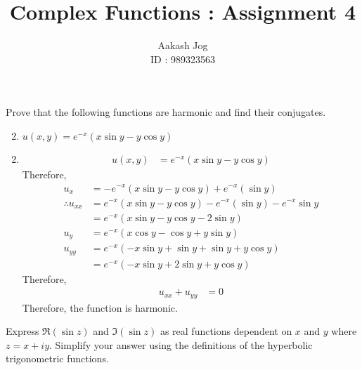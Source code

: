 \documentclass[fleqn, a4paper, 11pt, oneside]{amsart}
\title{Complex Functions : Assignment 4}
\author
{
	Aakash Jog\\
	ID : 989323563
}
\date{\formatdate{18}{11}{2015}}
\theoremstyle{definition}
\theoremstyle{theorem}
\begin{document}

\maketitle

\setcounter{question}{1}
\begin{question}
	Prove that the following functions are harmonic and find their conjugates.
	\begin{enumerate}
		\setcounter{enumi}{1}
		\item $u(x,y) = e^{-x} (x \sin y - y \cos y)$
	\end{enumerate}
\end{question}

\begin{solution}
	\begin{enumerate}
		\setcounter{enumi}{1}
		\item
			\begin{align*}
				u(x,y) & = e^{-x} (x \sin y - y \cos y)
			\end{align*}
			Therefore,
			\begin{align*}
				u_x                & = -e^{-x} (x \sin y - y \cos y) + e^{-x} (\sin y)                \\
				\therefore u_{x x} & = e^{-x} (x \sin y - y \cos y) - e^{-x} (\sin y) - e^{-x} \sin y \\
                                                   & = e^{-x} \left( x \sin y - y \cos y - 2 \sin y \right)           \\
				u_y                & = e^{-x} (x \cos y - \cos y + y \sin y)                          \\
				u_{y y}            & = e^{-x} \left( -x \sin y + \sin y + \sin y + y \cos y \right)   \\
                                                   & = e^{-x} \left( -x \sin y + 2 \sin y + y \cos y \right)
			\end{align*}
			Therefore,
			\begin{align*}
				u_{x x} + u_{y y} & = 0
			\end{align*}
			Therefore, the function is harmonic.
	\end{enumerate}
\end{solution}

\setcounter{question}{2}
\begin{question}
	Express $\Re(\sin z)$ and $\Im(\sin z)$ as real functions dependent on $x$ and $y$ where $z = x + i y$.
	Simplify your answer using the definitions of the hyperbolic trigonometric functions.
\end{question}
\end{document}
